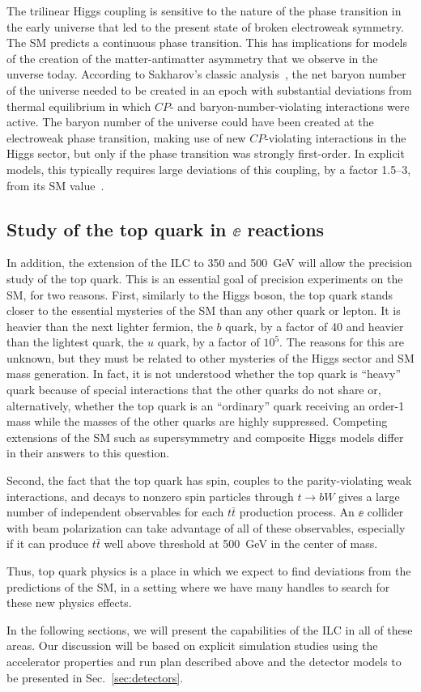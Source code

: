 The trilinear Higgs coupling is sensitive to the nature of the phase
transition in the early universe that led to the present state of
broken electroweak symmetry.  
The  SM predicts a continuous phase transition.   This has
implications for models of the creation of the matter-antimatter
asymmetry that we observe in the unverse today. According to
Sakharov's classic analysis~\cite{Sakharov:1967dj}, the net baryon number of the universe
needed to be created in an epoch with substantial deviations from
thermal equilibrium in which $CP$- and baryon-number-violating
interactions were active.    The baryon number of the universe could
have been created at the electroweak phase transition, making use of new
$CP$-violating interactions in the Higgs sector, but only if the phase
transition was strongly first-order.   In explicit models, this
typically requires large deviations of this coupling, by a factor
1.5--3, from its SM value~\cite{Morrissey:2012db}.





\subsection{Study of the top quark in $\ee$ reactions}

In addition, the extension of the ILC to 350 and 500~GeV will allow the precision
study of the top quark.   This is an essential goal of precision
experiments on the SM, for two reasons.  First, similarly to the Higgs
boson, the top quark stands closer to the essential mysteries of the
SM than any other quark or lepton.   It is heavier than the next
lighter fermion, the $b$ quark, by a factor of 40 and heavier than the
lightest quark, the $u$ quark, by a factor of $10^5$.  The reasons for
this are unknown, but they must be related to other mysteries of the
Higgs sector and SM mass generation.  In fact, it is not understood
whether the top quark is ``heavy'' quark because of special
interactions that the other quarks do not share or, alternatively, whether the top
quark is an ``ordinary'' quark receiving an order-1 mass while the
masses of the other quarks are highly suppressed.  Competing extensions of the
SM such as supersymmetry and composite Higgs models differ in their
answers to this question.   

Second, the fact that the top quark has spin, couples to the
parity-violating weak interactions, and decays to nonzero spin
particles through  $t\to bW$ gives a large number of independent
observables for each $t\bar t$ production process. An $\ee$ collider
with beam polarization can take advantage of all of these observables,
especially if it can produce $t\bar t$ well above threshold at
500~GeV in the center of mass.  

Thus, top quark physics is a place in which we expect to find
deviations from the predictions of the SM, in a setting where we have
many handles to search for these new physics effects.

In the following sections, we will present the capabilities of the ILC
in all of these areas.  Our discussion will be based on 
explicit simulation studies using the accelerator properties
and run plan  described above and the detector models to be presented
in  Sec.~\ref{sec:detectors}.